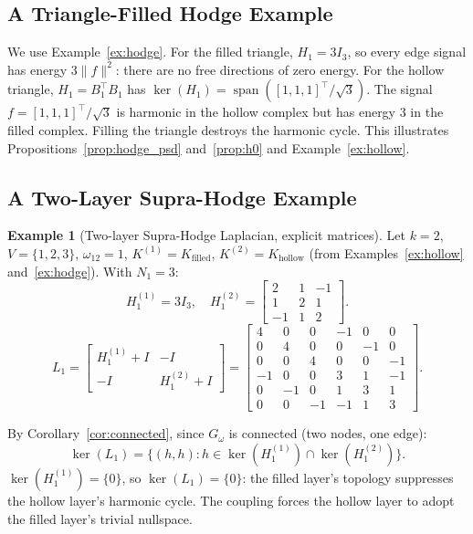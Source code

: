 \documentclass[11pt]{article}
\theoremstyle{definition}
\newtheorem{example}[theorem]{Example}
\theoremstyle{remark}
\newcommand{\Gom}{G_\omega}
\DeclareMathOperator{\spn}{span}
\begin{document}
\subsection{A Triangle-Filled Hodge Example}

We use Example~\ref{ex:hodge}. For the filled triangle, $H_1=3I_3$, so every
edge signal has energy $3\|f\|^2$: there are no free directions of zero energy.
For the hollow triangle, $H_1=B_1^\top B_1$ has $\ker(H_1)=\spn([1,1,1]^\top/
\sqrt{3})$. The signal $f=[1,1,1]^\top/\sqrt{3}$ is harmonic in the hollow
complex but has energy $3$ in the filled complex. Filling the triangle destroys
the harmonic cycle. This illustrates Propositions~\ref{prop:hodge_psd}
and~\ref{prop:h0} and Example~\ref{ex:hollow}.

\subsection{A Two-Layer Supra-Hodge Example}

\begin{example}[Two-layer Supra-Hodge Laplacian, explicit matrices]
\label{ex:sh_main}
Let $k=2$, $V=\{1,2,3\}$, $\omega_{12}=1$, $K^{(1)}=K_{\mathrm{filled}}$,
$K^{(2)}=K_{\mathrm{hollow}}$ (from Examples~\ref{ex:hollow}
and~\ref{ex:hodge}). With $N_1=3$:
\[
  H_1^{(1)} = 3I_3,\quad
  H_1^{(2)} = \begin{bmatrix}2&1&-1\\1&2&1\\-1&1&2\end{bmatrix}.
\]
\[
  L_1 =
  \begin{bmatrix}
    H_1^{(1)}+I & -I\\
    -I & H_1^{(2)}+I
  \end{bmatrix}
  =
  \begin{bmatrix}
    4 & 0 & 0 & -1 & 0 & 0\\
    0 & 4 & 0 & 0 & -1 & 0\\
    0 & 0 & 4 & 0 & 0 & -1\\
    -1& 0 & 0 & 3 & 1 & -1\\
    0 &-1 & 0 & 1 & 3 & 1\\
    0 & 0 &-1 &-1 & 1 & 3
  \end{bmatrix}.
\]

By Corollary~\ref{cor:connected}, since $\Gom$ is connected (two nodes, one
edge):
\[
  \ker(L_1) = \{(h,h):h\in\ker(H_1^{(1)})\cap\ker(H_1^{(2)})\}.
\]
$\ker(H_1^{(1)})=\{0\}$, so $\ker(L_1)=\{0\}$: the filled layer's topology
suppresses the hollow layer's harmonic cycle. The coupling forces the hollow
layer to adopt the filled layer's trivial nullspace.
\end{example}
\end{document}
